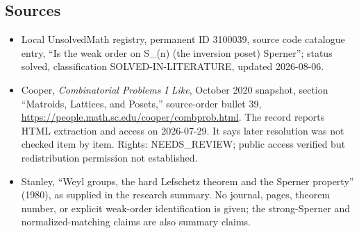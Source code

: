\documentclass[11pt]{article}
\begin{document}
\subsection{Sources}
\begin{itemize}
\item Local UnsolvedMath registry, permanent ID 3100039, source code catalogue entry, ``Is the weak order on S\_(n) (the inversion poset) Sperner''; status solved, classification SOLVED-IN-LITERATURE, updated 2026-08-06.
\item Cooper, \emph{Combinatorial Problems I Like}, October 2020 snapshot, section ``Matroids, Lattices, and Posets,'' source-order bullet 39, \url{https://people.math.sc.edu/cooper/combprob.html}. The record reports HTML extraction and access on 2026-07-29. It says later resolution was not checked item by item. Rights: NEEDS\_REVIEW; public access verified but redistribution permission not established.
\item Stanley, ``Weyl groups, the hard Lefschetz theorem and the Sperner property'' (1980), as supplied in the research summary. No journal, pages, theorem number, or explicit weak-order identification is given; the strong-Sperner and normalized-matching claims are also summary claims.
\end{itemize}
\end{document}
